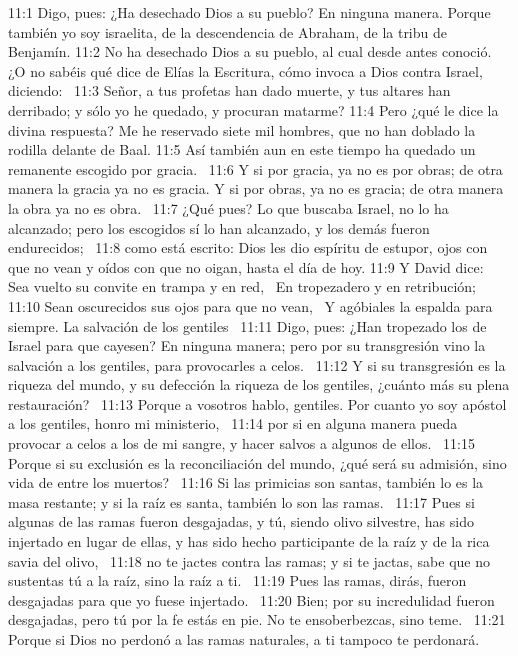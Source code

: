 11:1 Digo, pues: ¿Ha desechado Dios a su pueblo? En ninguna manera. Porque también yo soy israelita, de la descendencia de Abraham, de la tribu de Benjamín. 
11:2 No ha desechado Dios a su pueblo, al cual desde antes conoció. ¿O no sabéis qué dice de Elías la Escritura, cómo invoca a Dios contra Israel, diciendo:  
11:3 Señor, a tus profetas han dado muerte, y tus altares han derribado; y sólo yo he quedado, y procuran matarme? 
11:4 Pero ¿qué le dice la divina respuesta? Me he reservado siete mil hombres, que no han doblado la rodilla delante de Baal. 
11:5 Así también aun en este tiempo ha quedado un remanente escogido por gracia.  
11:6 Y si por gracia, ya no es por obras; de otra manera la gracia ya no es gracia. Y si por obras, ya no es gracia; de otra manera la obra ya no es obra.  
11:7 ¿Qué pues? Lo que buscaba Israel, no lo ha alcanzado; pero los escogidos sí lo han alcanzado, y los demás fueron endurecidos;  
11:8 como está escrito: Dios les dio espíritu de estupor, ojos con que no vean y oídos con que no oigan, hasta el día de hoy. 
11:9 Y David dice:  
Sea vuelto su convite en trampa y en red,  
En tropezadero y en retribución;  
11:10 Sean oscurecidos sus ojos para que no vean,  
Y agóbiales la espalda para siempre. 
La salvación de los gentiles  
11:11 Digo, pues: ¿Han tropezado los de Israel para que cayesen? En ninguna manera; pero por su transgresión vino la salvación a los gentiles, para provocarles a celos.  
11:12 Y si su transgresión es la riqueza del mundo, y su defección la riqueza de los gentiles, ¿cuánto más su plena restauración?  
11:13 Porque a vosotros hablo, gentiles. Por cuanto yo soy apóstol a los gentiles, honro mi ministerio,  
11:14 por si en alguna manera pueda provocar a celos a los de mi sangre, y hacer salvos a algunos de ellos.  
11:15 Porque si su exclusión es la reconciliación del mundo, ¿qué será su admisión, sino vida de entre los muertos?  
11:16 Si las primicias son santas, también lo es la masa restante; y si la raíz es santa, también lo son las ramas.  
11:17 Pues si algunas de las ramas fueron desgajadas, y tú, siendo olivo silvestre, has sido injertado en lugar de ellas, y has sido hecho participante de la raíz y de la rica savia del olivo,  
11:18 no te jactes contra las ramas; y si te jactas, sabe que no sustentas tú a la raíz, sino la raíz a ti.  
11:19 Pues las ramas, dirás, fueron desgajadas para que yo fuese injertado.  
11:20 Bien; por su incredulidad fueron desgajadas, pero tú por la fe estás en pie. No te ensoberbezcas, sino teme.  
11:21 Porque si Dios no perdonó a las ramas naturales, a ti tampoco te perdonará.  
